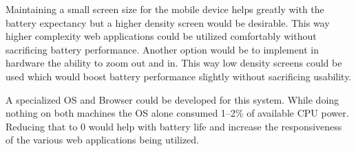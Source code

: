 Maintaining a small screen size for the mobile device helps greatly with the
battery expectancy but a higher density screen would be desirable.  This way
higher complexity web applications could be utilized comfortably without
sacrificing battery performance.  Another option would be to implement in
hardware the ability to zoom out and in.  This way low density screens could be
used which would boost battery performance slightly without sacrificing
usability.

A specialized OS and Browser could be developed for this system.  While doing
nothing on both machines the OS alone consumed 1--2\% of available CPU power.
Reducing that to 0 would help with battery life and increase the responsiveness
of the various web applications being utilized.
